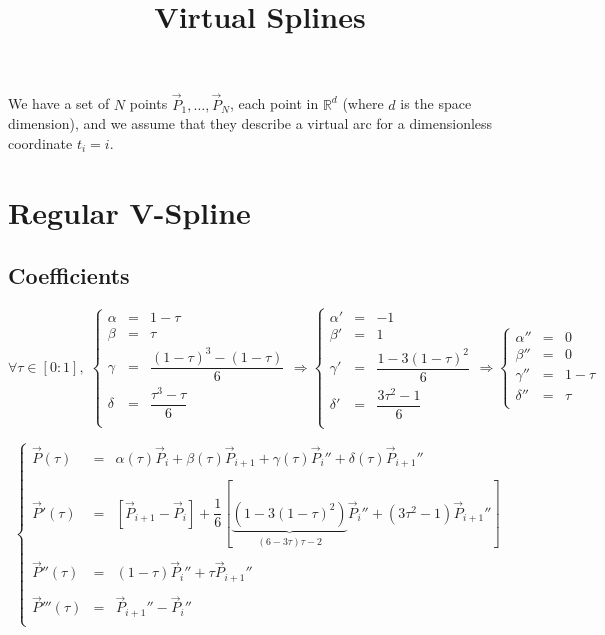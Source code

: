 \documentclass[aps,12pt]{revtex4}
\begin{document}
\title{Virtual Splines}
\maketitle
	
We have a set of $N$ points $\vec{P}_1,\ldots,\vec{P}_N$, each point in $\mathbb{R}^d$ (where $d$ is the space dimension), and we assume
that they describe a virtual arc for a dimensionless coordinate $t_i=i$.
 

\section{Regular V-Spline}
\subsection{Coefficients}
\begin{equation}
\forall \tau \in [0:1], \;
\left\lbrace
\begin{array}{rcl}
\alpha & = & 1-\tau\\
\beta  & = & \tau\\
\gamma & = & \dfrac{ (1-\tau)^3 - (1-\tau) }{6}\\
\delta & = & \dfrac{\tau^3-\tau}{6}\\
\end{array}
\right.
\Rightarrow
\left\lbrace
\begin{array}{rcl}
\alpha' & = & -1\\
\beta'  & = & 1\\
\gamma' & = & \dfrac{ 1-3(1-\tau)^2 }{6}\\
\delta' & = & \dfrac{3\tau^2-1}{6}\\
\end{array}
\right.
\Rightarrow
\left\lbrace
\begin{array}{rcl}
\alpha'' & = & 0\\
\beta''  & = & 0\\
\gamma'' & = & 1-\tau\\
\delta'' & = & \tau\\
\end{array}
\right.
\end{equation}

\begin{equation}
\left\lbrace
\begin{array}{rcl}
\vec{P}(\tau)  & = & \alpha(\tau)\vec{P}_i + \beta(\tau) \vec{P}_{i+1} + \gamma(\tau)\vec{P}_{i}'' + \delta(\tau) \vec{P}_{i+1}''\\
\\
\vec{P}'(\tau) & = & \left[\vec{P}_{i+1} - \vec{P}_i\right] + \dfrac{1}{6} \left[ \underbrace{(1-3(1-\tau)^2)}_{(6-3\tau)\tau-2} \vec{P}_{i}'' + (3\tau^2-1) \vec{P}_{i+1}'' \right] \\
\\
\vec{P}''(\tau) & = & (1-\tau) \vec{P}_{i}'' + \tau \vec{P}_{i+1}''\\
\\
\vec{P}'''(\tau) & = & \vec{P}_{i+1}'' - \vec{P}_i''\\
\end{array}
\right.
\end{equation}
\end{document}
